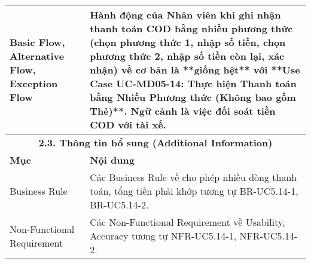 \begin{longtable}{|m{4cm}|p{11cm}|}
\hline
Basic Flow, Alternative Flow, Exception Flow & Hành động của Nhân viên khi ghi nhận thanh toán COD bằng nhiều phương thức (chọn phương thức 1, nhập số tiền, chọn phương thức 2, nhập số tiền còn lại, xác nhận) về cơ bản là **giống hệt** với **Use Case UC-MD05-14: Thực hiện Thanh toán bằng Nhiều Phương thức (Không bao gồm Thẻ)**. \newline Ngữ cảnh là việc đối soát tiền COD với tài xế. \\
\hline
\multicolumn{2}{|c|}{\textbf{2.3. Thông tin bổ sung (Additional Information)}} \\
\hline
\textbf{Mục} & \textbf{Nội dung} \\
\hline
Business Rule & Các Business Rule về cho phép nhiều dòng thanh toán, tổng tiền phải khớp tương tự BR-UC5.14-1, BR-UC5.14-2. \\
\hline
Non-Functional Requirement & Các Non-Functional Requirement về Usability, Accuracy tương tự NFR-UC5.14-1, NFR-UC5.14-2. \\
\hline
\end{longtable}

